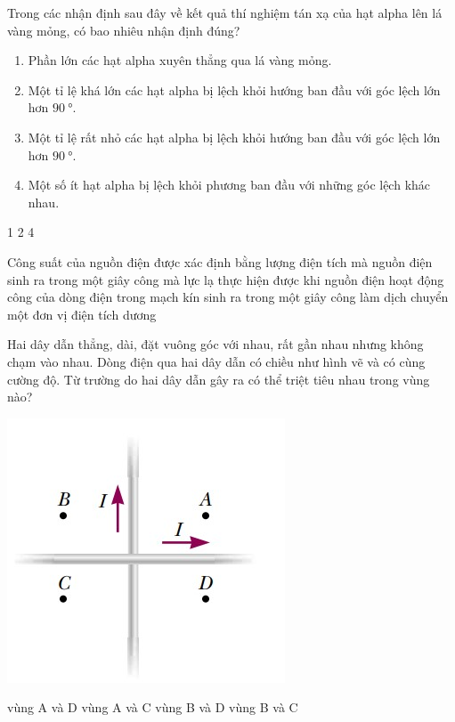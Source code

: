 \begin{ex}
	Trong các nhận định sau đây về kết quả thí nghiệm tán xạ của hạt alpha lên lá vàng mỏng, có bao nhiêu nhận định đúng?	
	\begin{enumerate}[label=(\arabic*)]
		\item Phần lớn các hạt alpha xuyên thẳng qua lá vàng mỏng.
		\item Một tỉ lệ khá lớn các hạt alpha bị lệch khỏi hướng ban đầu với góc lệch lớn hơn $\SI{90}{\degree}$.
		\item Một tỉ lệ rất nhỏ các hạt alpha bị lệch khỏi hướng ban đầu với góc lệch lớn hơn $\SI{90}{\degree}$.
		\item  Một số ít hạt alpha bị lệch khỏi phương ban đầu với những góc lệch khác nhau.
	\end{enumerate}
	\choice
	{1}
	{2}
	{}
	{4}
\end{ex}
\begin{ex}
	Công suất của nguồn điện được xác định bằng
	\choice
	{lượng điện tích mà nguồn điện sinh ra trong một giây}
	{công mà lực lạ thực hiện được khi nguồn điện hoạt động}
	{\True công của dòng điện trong mạch kín sinh ra trong một giây}
	{công làm dịch chuyển một đơn vị điện tích dương}
	\loigiai{}
\end{ex}
\begin{ex}
	Hai dây dẫn thẳng, dài, đặt vuông góc với nhau, rất gần nhau nhưng không chạm vào nhau. Dòng điện qua hai dây dẫn có chiều như hình vẽ và có cùng cường độ. Từ trường do hai dây dẫn gây ra có thể triệt tiêu nhau trong vùng nào?
	\begin{center}
		\includegraphics[width=0.3\linewidth]{../figs/VN12-Y24-PH-SYL-017P-8}
	\end{center}
	\choice
	{vùng A và D}
	{\True vùng A và C}
	{vùng B và D}
	{vùng B và C}
	\loigiai{}
\end{ex}
